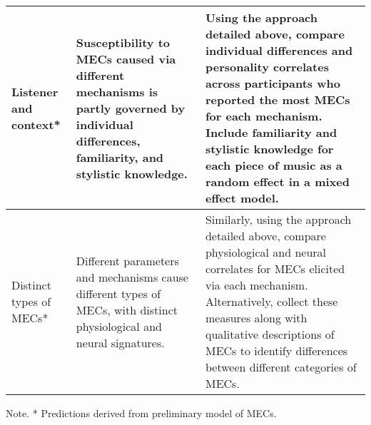 \begin{table}[t!]
\begin{threeparttable}
\begin{tabular*}{\textwidth}{
    >{\raggedright}p{}
    >{\raggedright}p{}
    >{\raggedright\arraybackslash}p{}}
\hline    
Listener and context* &
    Susceptibility to MECs caused via different mechanisms is partly governed by individual differences, familiarity, and stylistic knowledge. &
    Using the approach detailed above, compare individual differences and personality correlates across participants who reported the most MECs for each mechanism. Include familiarity and stylistic knowledge for each piece of music as a random effect in a mixed effect model. \\

\hline    
Distinct types of MECs* &
    Different parameters and mechanisms cause different types of MECs, with distinct physiological and neural signatures. &
    Similarly, using the approach detailed above, compare physiological and neural correlates for MECs elicited via each mechanism. Alternatively, collect these measures along with qualitative descriptions of MECs to identify differences between different categories of MECs. \\
    
\hline

\end{tabular*}
\begin{tablenotes}
\footnotesize
\item Note. * Predictions derived from preliminary model of MECs.
\end{tablenotes}
\end{threeparttable}
\end{table}